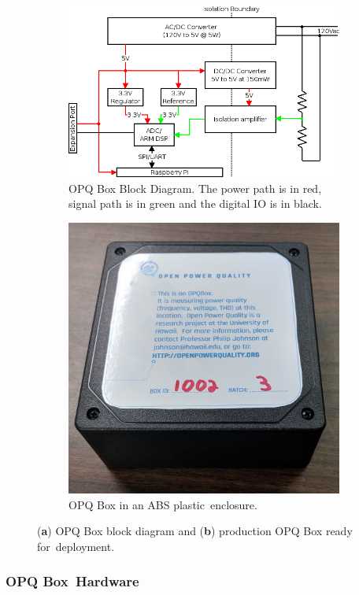 \documentclass[energies,article,accept,moreauthors,pdftex]{Definitions/mdpi}
\begin{document}
\begin{figure}[H]
\centering
\begin{subfigure}{.5\textwidth}
\centering
\includegraphics[width=0.9\linewidth]{images/opq-box/opqbox_diagram.png}
\caption{OPQ Box Block Diagram.
The power path is in red, signal path is in green and the digital IO is in black.}
\label{fig:opq:1:1}
\end{subfigure}%
\begin{subfigure}{.5\textwidth}
\centering
\includegraphics[width=0.7\linewidth]{images/opq-box/opqbox_photo.jpg}
\caption{OPQ Box in an ABS plastic~enclosure.}
\label{fig:opq:1:2}
\end{subfigure}
\caption{(\textbf{a}) OPQ Box block diagram and (\textbf{b}) production OPQ Box ready for~deployment.}
\label{fig:opq:2}
\end{figure}
\unskip

\subsubsection{OPQ Box~Hardware}\label{subsec:hardware}
\end{document}
